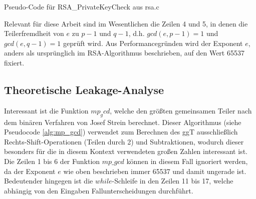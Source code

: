 \begin{algorithm}[h]
\DontPrintSemicolon
\caption{Pseudo-Code für RSA_PrivateKeyCheck aus rsa.c}
\label{alg:RSA_PrivateKeyCheck}

\end{algorithm}


%

Relevant für diese Arbeit sind im Wesentlichen die Zeilen 4 und 5, in denen die Teilerfremdheit von $e$ zu $p-1$ und $q-1$, d.h. $gcd(e,p-1) = 1$ und $gcd(e,q-1) = 1$ geprüft wird.
Aus Performancegründen wird der Exponent $e$, anders als ursprünglich im RSA-Algorithmus beschrieben, auf den Wert 65537 fixiert.

\subsection{Theoretische Leakage-Analyse}

Interessant ist die Funktion $mp_gcd$, welche den größten gemeinsamen Teiler nach dem binären Verfahren von Josef Strein \cite{SteinBinaryGCD} berechnet. 
Dieser Algorithmus (siehe Pseudocode \ref{alg:mp_gcd}) verwendet zum Berechnen des ggT ausschließlich Rechts-Shift-Operationen (Teilen durch 2) und Subtraktionen, wodurch dieser besonders für die in diesem Kontext verwendeten großen Zahlen interessant ist.
Die Zeilen 1 bis 6 der Funktion $mp\_gcd$ können in diesem Fall ignoriert werden, da der Exponent $e$ wie oben beschrieben immer 65537 und damit ungerade ist. 
Bedeutender hingegen ist die $while$-Schleife in den Zeilen 11 bis 17, welche abhängig von den Eingaben Fallunterscheidungen durchführt. 

